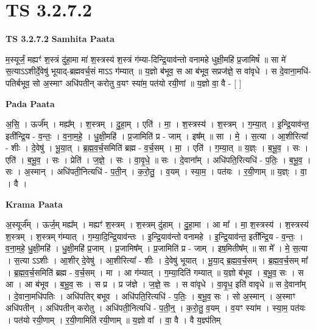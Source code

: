 \documentclass[17pt]{extarticle}
\begin{document}
\section{ TS 3.2.7.2 }

\textbf{TS 3.2.7.2 } \newline
\textbf{Samhita Paata} \newline

म॒स्यूर्जं॒ मह्यꣳ॑ श॒स्त्रं दु॑हा॒मा मा॑ श॒स्त्रस्य॑ श॒स्त्रं ग॑म्या-दिन्द्रि॒याव॑न्तो वनामहे धुक्षी॒महि॑ प्र॒जामिषं᳚ ॥ सा मे॑ स॒त्याऽऽशीर्दे॒वेषु॑ भूयाद्-ब्रह्मवर्च॒सं माऽऽ ग॑म्यात् ॥ य॒ज्ञो ब॑भूव॒ स आ ब॑भूव॒ सप्रज॑ज्ञे॒ स वा॑वृधे । स दे॒वाना॒मधि॑-पतिर्बभूव॒ सो अ॒स्माꣳ अधि॑पतीन् करोतु व॒यꣳ स्या॑म॒ पत॑यो रयी॒णां ॥ य॒ज्ञो वा॒ वै - [  ] \newline

\textbf{Pada Paata} \newline

अ॒सि॒ । ऊर्ज᳚म् । मह्य᳚म् । श॒स्त्रम् । दु॒हा॒म् । एति॑ । मा॒ । श॒स्त्रस्य॑ । श॒स्त्रम् । ग॒म्या॒त् । इ॒न्द्रि॒याव॑न्त॒ इती᳚न्द्रि॒य - व॒न्तः॒ । व॒ना॒म॒हे॒ । धु॒क्षी॒महि॑ । प्र॒जामिति॑ प्र - जाम् । इष᳚म् ॥ सा । मे॒ । स॒त्या । आ॒शीरित्या᳚ - शीः । दे॒वेषु॑ । भू॒या॒त् । ब्र॒ह्म॒व॒र्च॒समिति॑ ब्रह्म - व॒र्च॒सम् । मा॒ । एति॑ । ग॒म्या॒त् ॥ य॒ज्ञ्ः । ब॒भू॒व॒ । सः । एति॑ । ब॒भू॒व॒ । सः । प्रेति॑ । ज॒ज्ञे॒ । सः । वा॒वृ॒धे॒ ॥ सः । दे॒वाना᳚म् । अधि॑पति॒रित्यधि॑ - प॒तिः॒ । ब॒भू॒व॒ । सः । अ॒स्मान् । अधि॑पती॒नित्यधि॑ - प॒ती॒न् । क॒रो॒तु॒ । व॒यम् । स्या॒म॒ । पत॑यः । र॒यी॒णाम् ॥ य॒ज्ञ्ः । वा॒ । वै ।  \newline


\textbf{Krama Paata} \newline

अ॒स्यूर्ज᳚म् । ऊर्ज॒म् मह्य᳚म् । मह्यꣳ॑ श॒स्त्रम् । श॒स्त्रम् दु॑हाम् । दु॒हा॒मा । आ मा᳚ । मा॒ श॒स्त्रस्य॑ । श॒स्त्रस्य॑ श॒स्त्रम् । श॒स्त्रम् ग॑म्यात् । ग॒म्या॒दि॒न्द्रि॒याव॑न्तः । इ॒न्द्रि॒याव॑न्तो वनामहे । इ॒न्द्रि॒याव॑न्त॒ इती᳚न्द्रि॒य - व॒न्तः॒ । व॒ना॒म॒हे॒ धु॒क्षी॒महि॑ । धु॒क्षी॒महि॑ प्र॒जाम् । प्र॒जामिष᳚म् । प्र॒जामिति॑ प्र - जाम् । इष॒मितीष᳚म् ॥ सा मे᳚ । मे॒ स॒त्या । स॒त्या ऽऽशीः । आ॒शीर् दे॒वेषु॑ । आ॒शीरित्या᳚ - शीः । दे॒वेषु॑ भूयात् । भू॒या॒द् ब्र॒ह्म॒व॒र्च॒सम् । ब्र॒ह्म॒व॒र्च॒सम् मा᳚ । ब्र॒ह्म॒व॒र्च॒समिति॑ ब्रह्म - व॒र्च॒सम् । मा । आ ग॑म्यात् । ग॒म्या॒दिति॑ गम्यात् ॥ य॒ज्ञो ब॑भूव । ब॒भू॒व॒ सः । स आ । आ ब॑भूव । ब॒भू॒व॒ सः । स प्र । प्र ज॑ज्ञे । ज॒ज्ञे॒ सः । स वा॑वृधे । वा॒वृ॒ध॒ इति॑ वावृधे ॥ स दे॒वाना᳚म् । दे॒वाना॒मधि॑पतिः । अधि॑पतिर् बभूव । अधि॑पति॒रित्यधि॑ - प॒तिः॒ । ब॒भू॒व॒ सः । सो अ॒स्मान् । अ॒स्माꣳ अधि॑पतीन् । अधि॑पतीन् करोतु । अधि॑पती॒नित्यधि॑ - प॒ती॒न्॒ । क॒रो॒तु॒ व॒यम् । व॒यꣳ स्या॑म । स्या॒म॒ पत॑यः । पत॑यो रयी॒णाम् । र॒यी॒णामिति॑ रयी॒णाम् ॥ य॒ज्ञो वा᳚ । वा॒ वै । वै य॒ज्ञ्प॑तिम् \newline
\end{document}
